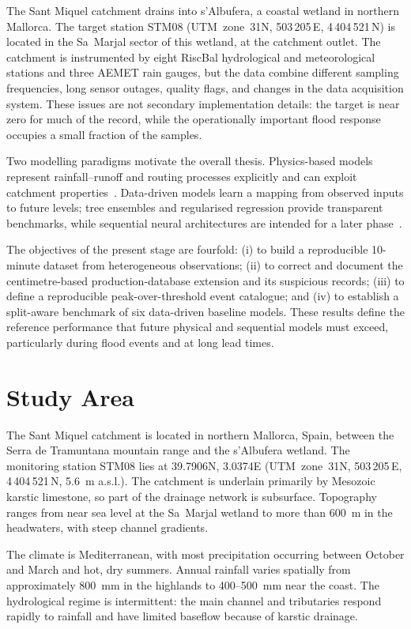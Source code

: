 \documentclass[twocolumn,twoside,a4paper,10pt]{IEEEtran}
\begin{document}
The Sant Miquel catchment drains into s'Albufera, a coastal wetland in
northern Mallorca. The target station STM08 (UTM~zone~31N, 503\,205\,E,
4\,404\,521\,N) is located in the Sa~Marjal sector of this wetland, at the
catchment outlet. The catchment is instrumented by eight RiscBal hydrological
and meteorological stations and three AEMET rain gauges, but the data combine
different sampling frequencies, long sensor outages, quality flags, and
changes in the data acquisition system. These issues are not secondary
implementation details: the target is near zero for much of the record, while
the operationally important flood response occupies a small fraction of the
samples.

Two modelling paradigms motivate the overall thesis. Physics-based models
represent rainfall--runoff and routing processes explicitly and can exploit
catchment properties~\cite{Beven2012}. Data-driven models learn a mapping from
observed inputs to future levels; tree ensembles and regularised regression
provide transparent benchmarks, while sequential neural architectures are
intended for a later phase~\cite{Breiman2001,Kratzert2019}.

The objectives of the present stage are fourfold: (i) to build a reproducible
10-minute dataset from heterogeneous observations; (ii) to correct and
document the centimetre-based production-database extension and its
suspicious records; (iii) to define a reproducible peak-over-threshold event
catalogue; and (iv) to establish a split-aware benchmark of six data-driven
baseline models. These results define the reference performance that future
physical and sequential models must exceed, particularly during flood events
and at long lead times.

\section{Study Area\label{sec:area}}

The Sant Miquel catchment is located in northern Mallorca, Spain, between the
Serra de Tramuntana mountain range and the s'Albufera wetland. The monitoring
station STM08 lies at 39.7906\textdegree{}N, 3.0374\textdegree{}E
(UTM~zone~31N, 503\,205\,E, 4\,404\,521\,N, 5.6~m a.s.l.). The catchment is
underlain primarily by Mesozoic karstic limestone, so part of the drainage
network is subsurface. Topography ranges from near sea level at the
Sa~Marjal wetland to more than 600~m in the headwaters, with steep channel
gradients.

The climate is Mediterranean, with most precipitation occurring between
October and March and hot, dry summers. Annual rainfall varies spatially from
approximately 800~mm in the highlands to 400--500~mm near the coast. The
hydrological regime is intermittent: the main channel and tributaries respond
rapidly to rainfall and have limited baseflow because of karstic drainage.
\end{document}

